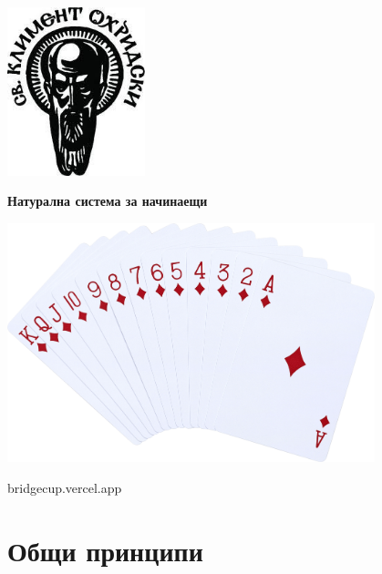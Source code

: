 \documentclass[10pt,a5paper]{extarticle}
\begin{document}
\begin{titlepage}
    \centering
    \includegraphics[width=0.3\textwidth]{images/su_logo_imagelarge.jpg} %
    \vfill
    {\Huge\bfseries Натурална система за начинаещи \par}
    \vfill
    \includegraphics[width=0.8\textwidth]{images/diamonds.png} %
    \vfill
    {\large bridgecup.vercel.app \par}
\end{titlepage}

\newpage

\tableofcontents

\section*{Общи принципи}
\end{document}

